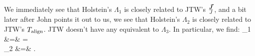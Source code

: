 We immediately see that Holstein's $\Lambda_1$ is closely related to JTW's $\frac{\bm{\vec{J}}}{J}$, and a bit later after John points it out to us, we see that Holstein's $\Lambda_2$ is closely related to JTW's $T_{\mathrm{align}}$.  JTW doesn't have any equivalent to $\Lambda_3$.  In particular, we find:
\bea
\Lambda_1 \hatj &=& \LambdaOne \hatj \;\; = \;\;   \\
\Lambda_2 &=& \Talign {}.
\eea




